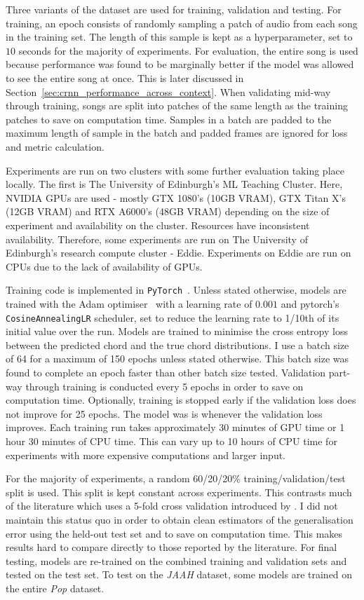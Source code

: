 Three variants of the dataset are used for training, validation and testing. For training, an epoch consists of randomly sampling a patch of audio from each song in the training set. The length of this sample is kept as a hyperparameter, set to $10$ seconds for the majority of experiments. For evaluation, the entire song is used because performance was found to be marginally better if the model was allowed to see the entire song at once. This is later discussed in Section~\ref{sec:crnn_performance_across_context}. When validating mid-way through training, songs are split into patches of the same length as the training patches to save on computation time. Samples in a batch are padded to the maximum length of sample in the batch and padded frames are ignored for loss and metric calculation.

Experiments are run on two clusters with some further evaluation taking place locally. The first is The University of Edinburgh's ML Teaching Cluster. Here, NVIDIA GPUs are used - mostly GTX 1080's (10GB VRAM), GTX Titan X's (12GB VRAM) and RTX A6000's (48GB VRAM) depending on the size of experiment and availability on the cluster. Resources have inconsistent availability. Therefore, some experiments are run on The University of Edinburgh's research compute cluster - Eddie. Experiments on Eddie are run on CPUs due to the lack of availability of GPUs. 

Training code is implemented in \texttt{PyTorch}~\citep{pytorch}. Unless stated otherwise, models are trained with the Adam optimiser~\citep{adam} with a learning rate of $0.001$ and pytorch's \texttt{CosineAnnealingLR} scheduler, set to reduce the learning rate to 1/10th of its initial value over the run. Models are trained to minimise the cross entropy loss between the predicted chord and the true chord distributions. I use a batch size of 64 for a maximum of 150 epochs unless stated otherwise. This batch size was found to complete an epoch faster than other batch size tested. Validation part-way through training is conducted every 5 epochs in order to save on computation time. Optionally, training is stopped early if the validation loss does not improve for 25 epochs. The model was is whenever the validation loss improves. Each training run takes approximately 30 minutes of GPU time or 1 hour 30 minutes of CPU time. This can vary up to 10 hours of CPU time for experiments with more expensive computations and larger input.

For the majority of experiments, a random 60/20/20\% training/validation/test split is used. This split is kept constant across experiments. This contrasts much of the literature which uses a 5-fold cross validation introduced by \citet{FourTimelyInsights}. I did not maintain this status quo in order to obtain clean estimators of the generalisation error using the held-out test set and to save on computation time. This makes results hard to compare directly to those reported by the literature. For final testing, models are re-trained on the combined training and validation sets and tested on the test set. To test on the \emph{JAAH} dataset, some models are trained on the entire \emph{Pop} dataset.